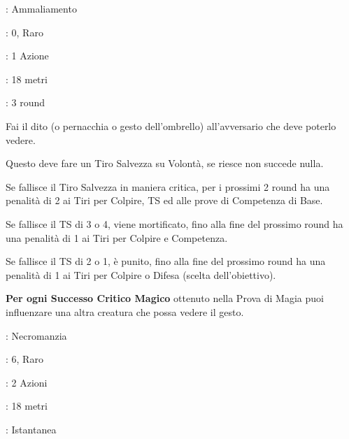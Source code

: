 \begin{multicols}{2}
\noindent\colorbox{OBSSgold!10}{
\begin{minipage}{0.95\linewidth}
\begin{description}[noitemsep, topsep=0pt, parsep=0pt, partopsep=0pt, leftmargin=0cm, labelwidth=1.3cm]
	\item[\textbf{Lista}]: Ammaliamento
	\item[\textbf{Livello}]: 0, Raro
	\item[\textbf{Lancio}]: 1 Azione
	\item[\textbf{Gittata}]: 18 metri
	\item[\textbf{Durata}]: 3 round
\end{description}
\end{minipage}}\smallskip

Fai il dito (o pernacchia o gesto dell'ombrello) all'avversario che deve poterlo vedere.

Questo deve fare un Tiro Salvezza su Volontà, se riesce non succede nulla.

Se fallisce il Tiro Salvezza in maniera critica, per i prossimi 2 round ha una penalità di 2 ai Tiri per Colpire, TS ed alle prove di Competenza di Base.

Se fallisce il TS di 3 o 4, viene mortificato, fino alla fine del prossimo round ha una penalità di 1 ai Tiri per Colpire e Competenza.

Se fallisce il TS di 2 o 1, è punito, fino alla fine del prossimo round ha una penalità di 1 ai Tiri per Colpire o Difesa (scelta dell'obiettivo).

\textbf{Per ogni Successo Critico Magico} ottenuto nella Prova di Magia puoi influenzare una altra creatura che possa vedere il gesto.

\noindent\colorbox{OBSSgold!10}{
\begin{minipage}{0.95\linewidth}
\begin{description}[noitemsep, topsep=0pt, parsep=0pt, partopsep=0pt, leftmargin=0cm, labelwidth=1.3cm]
	\item[\textbf{Lista}]: Necromanzia
	\item[\textbf{Livello}]: 6, Raro
	\item[\textbf{Lancio}]: 2 Azioni
	\item[\textbf{Gittata}]: 18 metri
	\item[\textbf{Durata}]: Istantanea
\end{description}
\end{minipage}}\smallskip


\end{multicols}
